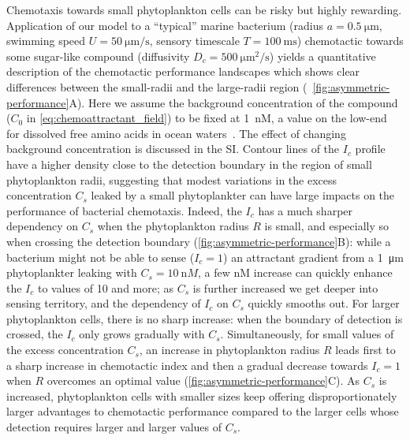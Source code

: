 \documentclass[9pt,twocolumn,twoside]{pnas-new}
\begin{document}
Chemotaxis towards small phytoplankton cells can be risky but highly rewarding.
Application of our model to a ``typical'' marine bacterium (radius $a=\SI{0.5}{\micro\m}$, swimming speed $U=\SI{50}{\micro\m\per\s}$, sensory timescale $T=\SI{100}{\milli\s}$) chemotactic towards some sugar-like compound (diffusivity $D_c=\SI{500}{\micro\m^2\per\s}$) yields a quantitative description of the chemotactic performance landscapes which shows clear differences between the small-radii and the large-radii region (~\autoref{fig:asymmetric-performance}A).
Here we assume the background concentration of the compound ($C_0$ in \autoref{eq:chemoattractant_field}) to be fixed at \SI{1}{\nano M}, a value on the low-end for dissolved free amino acids in ocean waters~\cite{lee1975amino}. The effect of changing background concentration is discussed in the SI.
Contour lines of the $I_c$ profile have a higher density close to the detection boundary in the region of small phytoplankton radii, suggesting that modest variations in the excess concentration $C_s$ leaked by a small phytoplankter can have large impacts on the performance of bacterial chemotaxis.
Indeed, the $I_c$ has a much sharper dependency on $C_s$ when the phytoplankton radius $R$ is small, and especially so when crossing the detection boundary (\autoref{fig:asymmetric-performance}B): while a bacterium might not be able to sense ($I_c=1$) an attractant gradient from a \SI{1}{\micro\m} phytoplankter leaking with $C_s=\SI{10}{\nano M}$, a few \si{\nano M} increase can quickly enhance the $I_c$ to values of 10 and more; as $C_s$ is further increased we get deeper into sensing territory, and the dependency of $I_c$ on $C_s$ quickly smooths out.
For larger phytoplankton cells, there is no sharp increase: when the boundary of detection is crossed, the $I_c$ only grows gradually with $C_s$.
Simultaneously, for small values of the excess concentration $C_s$, an increase in phytoplankton radius $R$ leads first to a sharp increase in chemotactic index and then a gradual decrease towards $I_c=1$ when $R$ overcomes an optimal value (\autoref{fig:asymmetric-performance}C). As $C_s$ is increased, phytoplankton cells with smaller sizes keep offering disproportionately larger advantages to chemotactic performance compared to the larger cells whose detection requires larger and larger values of $C_s$.
\end{document}
